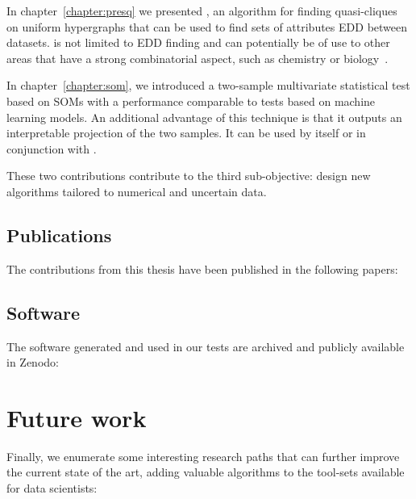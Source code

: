 In chapter~\ref{chapter:presq} we presented \PresQ, an algorithm for finding quasi-cliques
on uniform hypergraphs that can be used to find sets of attributes \gls{EDD}
between datasets. \PresQ is not limited to \gls{EDD} finding and can potentially be
of use to other areas that have a strong combinatorial aspect, such as
chemistry or biology~\cite{Bretto2013}.

In chapter~\ref{chapter:som}, we introduced a two-sample multivariate statistical test based on
\glspl{SOM} with a performance comparable to tests based on machine learning models. An additional advantage
of this technique is that it outputs an interpretable projection of the two samples. It can be used
by itself or in conjunction with \PresQ.

These two contributions contribute to the third sub-objective: design new algorithms tailored to numerical and
uncertain data.

\subsection{Publications}

The contributions from this thesis have been published in the following
papers:

\begin{refsection}
\nocite{Alvarez2019,Alvarez2021inference,AlvarezAyllonPresQ2022,Alvarez2022SOM}

\printbibliography[heading=none]
\end{refsection}

\subsection{Software}

The software generated and used in our tests are archived and publicly
available in Zenodo:

\begin{refsection}
\nocite{PresQ,SOMA}

\printbibliography[heading=none]
\end{refsection}

\section{Future work}

Finally, we enumerate some interesting research paths that can further improve
the current state of the art, adding valuable algorithms to the tool-sets
available for data scientists:

